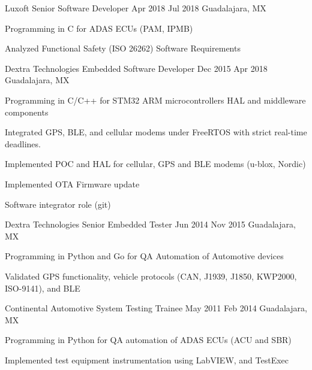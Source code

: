 \documentclass{resume} %
\begin{document}
\job
    {Luxoft}
    {Senior Software Developer}
    {Apr 2018}
    {Jul 2018}
    {Guadalajara, MX}
    {
    \begin{itemize-bullets}
    \item{Programming in C for ADAS ECUs (PAM, IPMB)}
    \item{Analyzed Functional Safety (ISO 26262) Software Requirements}
    \end{itemize-bullets}
    }


\job
    {Dextra Technologies}
    {Embedded Software Developer}
    {Dec 2015}
    {Apr 2018}
    {Guadalajara, MX}
    {
    \begin{itemize-bullets}
    \item{Programming in C/C++ for STM32 ARM microcontrollers HAL and middleware components}
    \item{Integrated GPS, BLE, and cellular modems under FreeRTOS with strict real-time deadlines.}
    \item{Implemented POC and HAL for cellular, GPS and BLE modems (u-blox, Nordic)}
    \item{Implemented OTA Firmware update}
    \item{Software integrator role (git)}
    \end{itemize-bullets}
    }


\job
    {Dextra Technologies}
    {Senior Embedded Tester}
    {Jun 2014}
    {Nov 2015}
    {Guadalajara, MX}
    {
    \begin{itemize-bullets}
    \item{Programming in Python and Go for QA Automation of Automotive devices}
    \item{Validated GPS functionality, vehicle protocols (CAN, J1939, J1850, KWP2000, ISO-9141), and BLE}
    \end{itemize-bullets}
    }


\job
    {Continental Automotive}
    {System Testing Trainee}
    {May 2011}
    {Feb 2014}
    {Guadalajara, MX}
    {
    \begin{itemize-bullets}
    \item{Programming in Python for QA automation of ADAS ECUs (ACU and SBR)}
    \item{Implemented test equipment instrumentation using LabVIEW, and TestExec}
    \end{itemize-bullets}
    }


\end{document}
